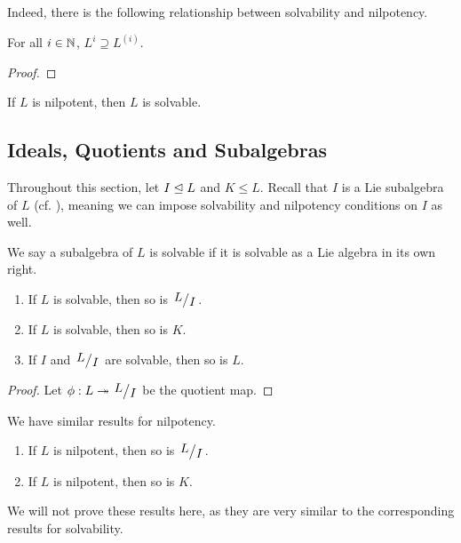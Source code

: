 Indeed, there is the following relationship between solvability and nilpotency.

\begin{lemma}
    For all $i \in \mathbb{N}$, $L^i \supseteq L^{(i)}$.
\end{lemma}
\begin{proof}
    \sorry %
\end{proof}

\begin{boxcorollary}
    If $L$ is nilpotent, then $L$ is solvable.
\end{boxcorollary}

\subsection{Ideals, Quotients and Subalgebras}

Throughout this section, let $I \trianglelefteq L$ and $K \leq L$. Recall that $I$ is a Lie subalgebra of $L$ (cf. ), meaning we can impose solvability and nilpotency conditions on $I$ as well.

\begin{definition}
    We say a subalgebra of $L$ is solvable if it is solvable as a Lie algebra in its own right.
\end{definition}

\begin{boxproposition}
    \hfill
    \begin{enumerate}[label = \normalfont\arabic*., noitemsep]
        \item If $L$ is solvable, then so is $\quotient{L}{I}$.
        \item If $L$ is solvable, then so is $K$.
        \item If $I$ and $\quotient{L}{I}$ are solvable, then so is $L$.
    \end{enumerate}
\end{boxproposition}
\begin{proof}
    Let $\phi : L \surj \quotient{L}{I}$ be the quotient map. \sorry %
\end{proof}

We have similar results for nilpotency.

\begin{boxproposition}
    \hfill
    \begin{enumerate}[label = \normalfont\arabic*., noitemsep]
        \item If $L$ is nilpotent, then so is $\quotient{L}{I}$.
        \item If $L$ is nilpotent, then so is $K$.
    \end{enumerate}
\end{boxproposition}

We will not prove these results here, as they are very similar to the corresponding results for solvability.

